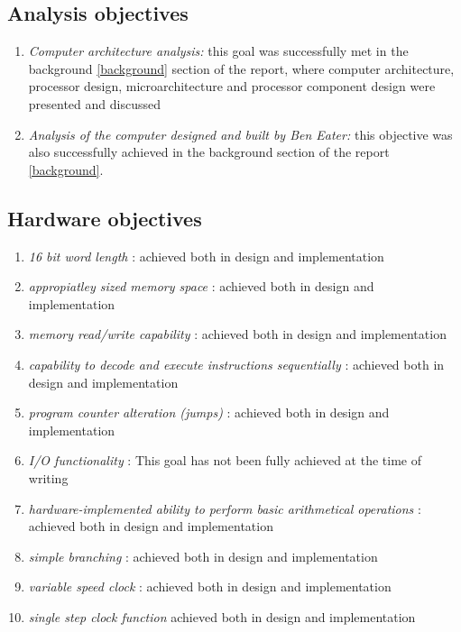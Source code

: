\subsection{Analysis objectives}
\begin{enumerate}
  \item \emph{Computer architecture analysis:} this goal was successfully met in the background
  \ref{background} section of the report, where computer architecture, processor design,
  microarchitecture and processor component design were presented and discussed
  \item \emph{Analysis of the computer designed and built by Ben Eater: } \cite{eater2019breadboard}
  this objective was also successfully achieved in the background section of the report
  \ref{background}.
\end{enumerate}

\subsection{Hardware objectives}
\begin{enumerate}
  \item \emph{16 bit word length} : achieved both in design and implementation
  \item \emph{appropiatley sized memory space} : achieved both in design and implementation
  \item \emph{memory read/write capability} : achieved both in design and implementation
  \item \emph{capability to decode and execute instructions sequentially} : achieved both in design and implementation
  \item \emph{program counter alteration (jumps)} : achieved both in design and implementation
  \item \emph{I/O functionality} : This goal has not been fully achieved at the time of writing
  \item \emph{hardware-implemented ability to perform basic arithmetical operations} : achieved both in design and implementation
  \item \emph{simple branching} : achieved both in design and implementation
  \item \emph{variable speed clock} : achieved both in design and implementation
  \item \emph{single step clock function} achieved both in design and implementation
\end{enumerate}

